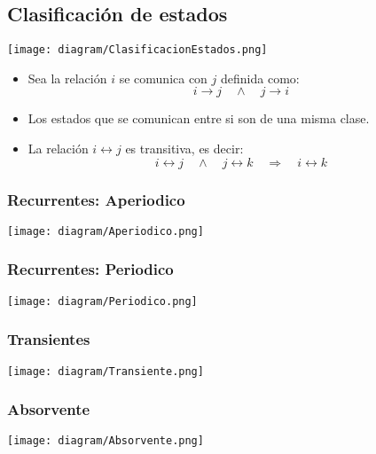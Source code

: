 \documentclass{templateNote}
\begin{document}
\subsection{Clasificaci\'on de estados}
\begin{center}
    \texttt{[image: diagram/ClasificacionEstados.png]}
\end{center}
\begin{itemize}
    \item Sea la relación $i$ se comunica con $j$ definida como:
    \begin{equation*}
        i \rightarrow j \quad \wedge \quad j \rightarrow i
    \end{equation*}

    \item Los estados que se comunican entre si son de una misma clase.
    
    \item La relaci\'on $i \leftrightarrow j$ es transitiva, es decir:
    \begin{equation*}
        i \leftrightarrow j \quad \wedge \quad j \leftrightarrow k \quad \Rightarrow \quad i \leftrightarrow k
    \end{equation*}
\end{itemize}
\subsubsection{Recurrentes: Aperiodico}
\begin{center}
    \texttt{[image: diagram/Aperiodico.png]}
\end{center}
\subsubsection{Recurrentes: Periodico}
\begin{center}
    \texttt{[image: diagram/Periodico.png]}
\end{center}

\subsubsection{Transientes}
\begin{center}
    \texttt{[image: diagram/Transiente.png]}
\end{center}
\subsubsection{Absorvente}
\begin{center}
    \texttt{[image: diagram/Absorvente.png]}
\end{center}
\end{document}
